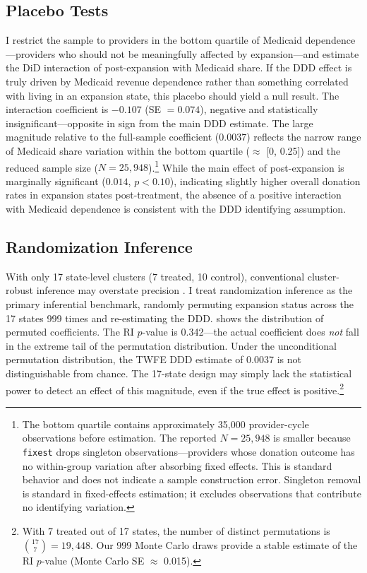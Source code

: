 \documentclass[12pt]{article}
\begin{document}
\subsection{Placebo Tests}

I restrict the sample to providers in the bottom quartile of Medicaid dependence---providers who should not be meaningfully affected by expansion---and estimate the DiD interaction of post-expansion with Medicaid share. If the DDD effect is truly driven by Medicaid revenue dependence rather than something correlated with living in an expansion state, this placebo should yield a null result. The interaction coefficient is $-0.107$ (SE $= 0.074$), negative and statistically insignificant---opposite in sign from the main DDD estimate. The large magnitude relative to the full-sample coefficient (0.0037) reflects the narrow range of Medicaid share variation within the bottom quartile ($\approx$ [0, 0.25]) and the reduced sample size ($N = 25{,}948$).\footnote{The bottom quartile contains approximately 35,000 provider-cycle observations before estimation. The reported $N = 25{,}948$ is smaller because \texttt{fixest} drops singleton observations---providers whose donation outcome has no within-group variation after absorbing fixed effects. This is standard behavior and does not indicate a sample construction error. Singleton removal is standard in fixed-effects estimation; it excludes observations that contribute no identifying variation.} While the main effect of post-expansion is marginally significant ($0.014$, $p < 0.10$), indicating slightly higher overall donation rates in expansion states post-treatment, the absence of a positive interaction with Medicaid dependence is consistent with the DDD identifying assumption.



\subsection{Randomization Inference}

With only 17 state-level clusters (7 treated, 10 control), conventional cluster-robust inference may overstate precision \citep{cameron2008bootstrap}. I treat randomization inference as the primary inferential benchmark, randomly permuting expansion status across the 17 states 999 times and re-estimating the DDD.  shows the distribution of permuted coefficients. The RI $p$-value is 0.342---the actual coefficient does \textit{not} fall in the extreme tail of the permutation distribution. Under the unconditional permutation distribution, the TWFE DDD estimate of 0.0037 is not distinguishable from chance. The 17-state design may simply lack the statistical power to detect an effect of this magnitude, even if the true effect is positive.\footnote{With 7 treated out of 17 states, the number of distinct permutations is $\binom{17}{7} = 19{,}448$. Our 999 Monte Carlo draws provide a stable estimate of the RI $p$-value (Monte Carlo SE $\approx$ 0.015).}
\end{document}
